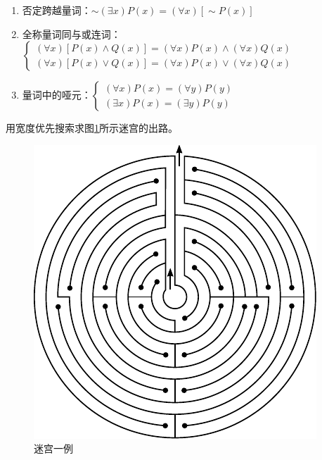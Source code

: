 \begin{solution}
\begin{enumerate}
		\item 否定跨越量词：$\sim (\exists x) P(x) = (\forall x)[\sim P(x)]$
		\item 全称量词同与或连词：$\begin{cases}
		(\forall x)[P(x) \wedge Q(x)] = (\forall x) P(x) \wedge (\forall x) Q(x) \\
		(\forall x)[P(x) \vee Q(x)] = (\forall x) P(x) \vee (\forall x) Q(x)
		\end{cases}$
		\item 量词中的哑元：$\begin{cases}
		(\forall x) P(x) = (\forall y) P(y) \\
		(\exists x) P(x) = (\exists y) P(y)
		\end{cases}$
	\end{enumerate}
\end{solution}

\begin{question}
用宽度优先搜索求图\ref{Fig:maze}所示迷宫的出路。
	\begin{figure}[h]
		\centering
		\includegraphics{figures/ques-3.6.pdf}
		\caption{迷宫一例} \label{Fig:maze}
	\end{figure}
\end{question}
\begin{solution}
\end{solution}


